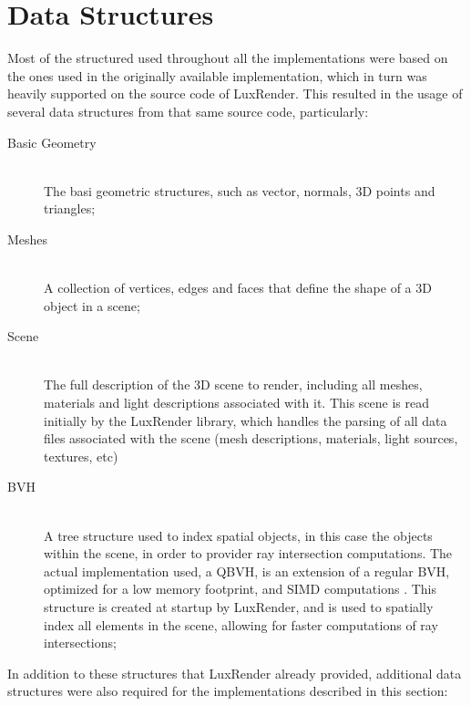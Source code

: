 \documentclass[main.tex]{subfiles}
\begin{document}
\section{Data Structures} \label{section:data_structures}

Most of the structured used throughout all the implementations were based on the ones used in the originally available implementation, which in turn was heavily supported on the source code of LuxRender. This resulted in the usage of several data structures from that same source code, particularly:

\begin{description}
\item[Basic Geometry] \hfill \\
  The basi geometric structures, such as vector, normals, 3D points and triangles;

\item[Meshes] \hfill \\
  A collection of vertices, edges and faces that define the shape of a 3D object in a scene;

\item[Scene] \hfill \\
  The full description of the 3D scene to render, including all meshes, materials and light descriptions associated with it. This scene is read initially by the LuxRender library, which handles the parsing of all data files associated with the scene (mesh descriptions, materials, light sources, textures, etc)

\item[\acl{BVH}] \hfill \\
  A tree structure used to index spatial objects, in this case the objects within the scene, in order to provider ray intersection computations. The actual implementation used, a \acf{QBVH}, is an extension of a regular \acs{BVH}, optimized for a low memory footprint, and \acs{SIMD} computations \cite{dammertz2008shallow,Stich2009hpg}. This structure is created at startup by LuxRender, and is used to spatially index all elements in the scene, allowing for faster computations of ray intersections;

\end{description}

In addition to these structures that LuxRender already provided, additional data structures were also required for the implementations described in this section:
\end{document}
